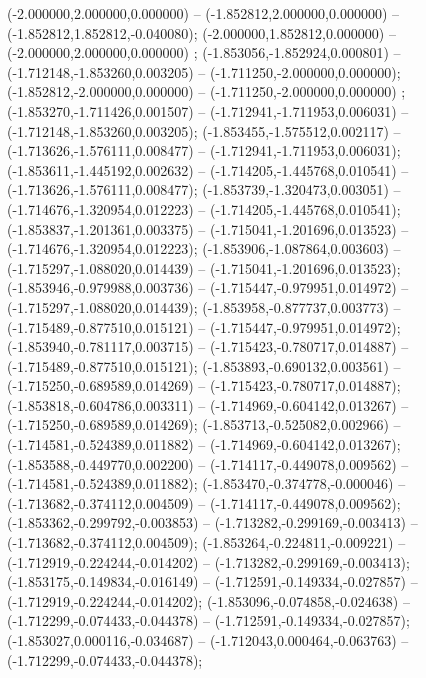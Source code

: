  (-2.000000,2.000000,0.000000) -- (-1.852812,2.000000,0.000000) -- (-1.852812,1.852812,-0.040080);
 (-2.000000,1.852812,0.000000) -- (-2.000000,2.000000,0.000000) ;
 (-1.853056,-1.852924,0.000801) -- (-1.712148,-1.853260,0.003205) -- (-1.711250,-2.000000,0.000000);
 (-1.852812,-2.000000,0.000000) -- (-1.711250,-2.000000,0.000000) ;
 (-1.853270,-1.711426,0.001507) -- (-1.712941,-1.711953,0.006031) -- (-1.712148,-1.853260,0.003205);
 (-1.853455,-1.575512,0.002117) -- (-1.713626,-1.576111,0.008477) -- (-1.712941,-1.711953,0.006031);
 (-1.853611,-1.445192,0.002632) -- (-1.714205,-1.445768,0.010541) -- (-1.713626,-1.576111,0.008477);
 (-1.853739,-1.320473,0.003051) -- (-1.714676,-1.320954,0.012223) -- (-1.714205,-1.445768,0.010541);
 (-1.853837,-1.201361,0.003375) -- (-1.715041,-1.201696,0.013523) -- (-1.714676,-1.320954,0.012223);
 (-1.853906,-1.087864,0.003603) -- (-1.715297,-1.088020,0.014439) -- (-1.715041,-1.201696,0.013523);
 (-1.853946,-0.979988,0.003736) -- (-1.715447,-0.979951,0.014972) -- (-1.715297,-1.088020,0.014439);
 (-1.853958,-0.877737,0.003773) -- (-1.715489,-0.877510,0.015121) -- (-1.715447,-0.979951,0.014972);
 (-1.853940,-0.781117,0.003715) -- (-1.715423,-0.780717,0.014887) -- (-1.715489,-0.877510,0.015121);
 (-1.853893,-0.690132,0.003561) -- (-1.715250,-0.689589,0.014269) -- (-1.715423,-0.780717,0.014887);
 (-1.853818,-0.604786,0.003311) -- (-1.714969,-0.604142,0.013267) -- (-1.715250,-0.689589,0.014269);
 (-1.853713,-0.525082,0.002966) -- (-1.714581,-0.524389,0.011882) -- (-1.714969,-0.604142,0.013267);
 (-1.853588,-0.449770,0.002200) -- (-1.714117,-0.449078,0.009562) -- (-1.714581,-0.524389,0.011882);
 (-1.853470,-0.374778,-0.000046) -- (-1.713682,-0.374112,0.004509) -- (-1.714117,-0.449078,0.009562);
 (-1.853362,-0.299792,-0.003853) -- (-1.713282,-0.299169,-0.003413) -- (-1.713682,-0.374112,0.004509);
 (-1.853264,-0.224811,-0.009221) -- (-1.712919,-0.224244,-0.014202) -- (-1.713282,-0.299169,-0.003413);
 (-1.853175,-0.149834,-0.016149) -- (-1.712591,-0.149334,-0.027857) -- (-1.712919,-0.224244,-0.014202);
 (-1.853096,-0.074858,-0.024638) -- (-1.712299,-0.074433,-0.044378) -- (-1.712591,-0.149334,-0.027857);
 (-1.853027,0.000116,-0.034687) -- (-1.712043,0.000464,-0.063763) -- (-1.712299,-0.074433,-0.044378);
